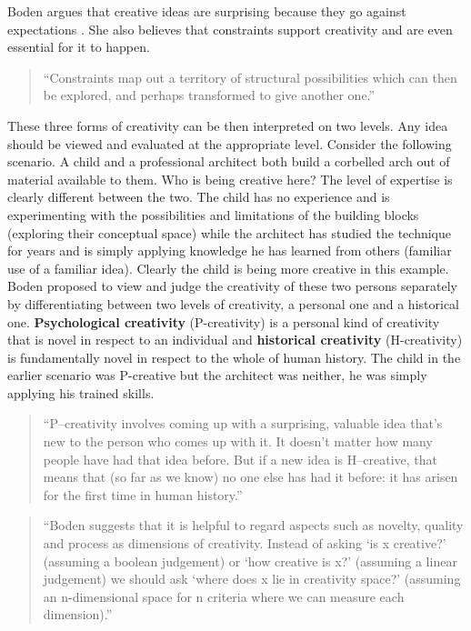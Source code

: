 Boden argues that creative ideas are surprising because they go against expectations \autocite{Boden2003}. She also believes that constraints support creativity and are even essential for it to happen.

\begin{quotation}
  ``Constraints map out a territory of structural possibilities which can then be explored, and perhaps transformed to give another one.'' 
\end{quotation}

These three forms of creativity can be then interpreted on two levels. Any idea should be viewed and evaluated at the appropriate level. Consider the following scenario. A child and a professional architect both build a corbelled arch out of material available to them. Who is being creative here? The level of expertise is clearly different between the two. The child has no experience and is experimenting with the possibilities and limitations of the building blocks (exploring their conceptual space) while the architect has studied the technique for years and is simply applying knowledge he has learned from others (familiar use of a familiar idea). Clearly the child is being more creative in this example. Boden proposed to view and judge the creativity of these two persons separately by differentiating between two levels of creativity, a personal one and a historical one. \textbf{Psychological creativity} (P-creativity) is a personal kind of creativity that is novel in respect to an individual and \textbf{historical creativity} (H-creativity) is fundamentally novel in respect to the whole of human history. The child in the earlier scenario was P-creative but the architect was neither, he was simply applying his trained skills.

\begin{quotation}
	``P–creativity involves coming up with a surprising, valuable idea that’s new to the person who comes up with it. It doesn’t matter how many people have had that idea before. But if a new idea is H–creative, that means that (so far as we know) no one else has had it before: it has arisen for the first time in human history.'' 
\end{quotation}

\begin{quotation}
  ``Boden suggests that it is helpful to regard aspects such as novelty, quality and process as dimensions of creativity. Instead of asking ‘is x creative?’ (assuming a boolean judgement) or ‘how creative is x?’ (assuming a linear judgement) we should ask ‘where does x lie in creativity space?’ (assuming an n-dimensional space for n criteria where we can measure each dimension).'' 
\end{quotation}

